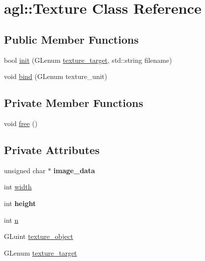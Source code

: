 \hypertarget{classagl_1_1Texture}{}\section{agl\+::Texture Class Reference}
\label{classagl_1_1Texture}
\subsection*{Public Member Functions}
\begin{DoxyCompactItemize}
\item 
bool \mbox{\hyperlink{classagl_1_1Texture_a1e6c013b0e7afb78c983c5553afa23f9}{init}} (G\+Lenum \mbox{\hyperlink{classagl_1_1Texture_a0e8c9abdf2b2da161c83a9c62807c0cb}{texture\+\_\+target}}, std\+::string filename)
\item 
void \mbox{\hyperlink{classagl_1_1Texture_a9f0f84d3edab9c07d0c1580e7647fbb9}{bind}} (G\+Lenum texture\+\_\+unit)
\end{DoxyCompactItemize}
\subsection*{Private Member Functions}
\begin{DoxyCompactItemize}
\item 
void \mbox{\hyperlink{classagl_1_1Texture_aed12d98a17d4eeeb851cad6c81abbada}{free}} ()
\end{DoxyCompactItemize}
\subsection*{Private Attributes}
\begin{DoxyCompactItemize}
\item 
\mbox{\label{classagl_1_1Texture_a80caa5bc70668de3bba66b115d95fd83}} 
unsigned char $\ast$ {\bfseries image\+\_\+data}
\item 
int \mbox{\hyperlink{classagl_1_1Texture_a77dd6f3abb916a88ce172aff30da4a36}{width}}
\item 
\mbox{\label{classagl_1_1Texture_a5d0b8de4ef82cb8bcb5f3a9a19bc55a9}} 
int {\bfseries height}
\item 
int \mbox{\hyperlink{classagl_1_1Texture_a0e1592e4478c250b371ee9deeb6aef13}{n}}
\item 
G\+Luint \mbox{\hyperlink{classagl_1_1Texture_a84abd104815f07ab1dede19b4836e5d3}{texture\+\_\+object}}
\item 
G\+Lenum \mbox{\hyperlink{classagl_1_1Texture_a0e8c9abdf2b2da161c83a9c62807c0cb}{texture\+\_\+target}}
\end{DoxyCompactItemize}


